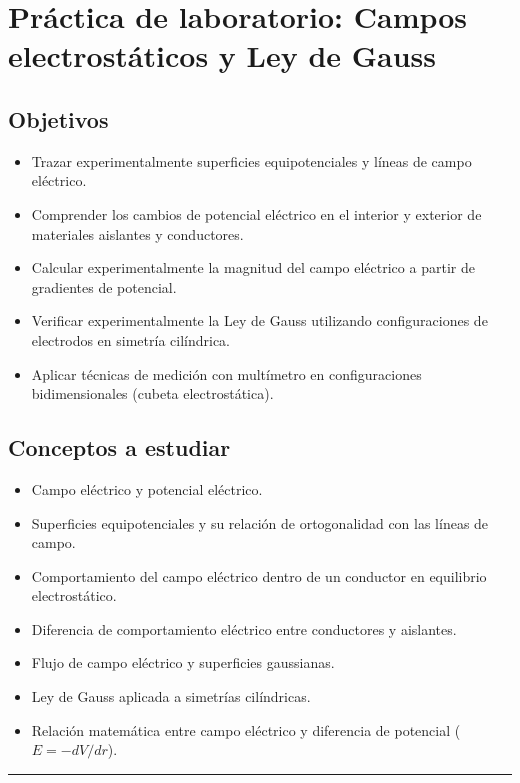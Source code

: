 \section*{Práctica de laboratorio: Campos electrostáticos y Ley de Gauss}

\subsection*{Objetivos}

\begin{itemize}
\item Trazar experimentalmente superficies equipotenciales y líneas de campo eléctrico.
\item Comprender los cambios de potencial eléctrico en el interior y exterior de materiales aislantes y conductores.
\item Calcular experimentalmente la magnitud del campo eléctrico a partir de gradientes de potencial.
\item Verificar experimentalmente la Ley de Gauss utilizando configuraciones de electrodos en simetría cilíndrica.
\item Aplicar técnicas de medición con multímetro en configuraciones bidimensionales (cubeta electrostática).
\end{itemize}

\subsection*{Conceptos a estudiar}

\begin{itemize}
\item Campo eléctrico y potencial eléctrico.
\item Superficies equipotenciales y su relación de ortogonalidad con las líneas de campo.
\item Comportamiento del campo eléctrico dentro de un conductor en equilibrio electrostático.
\item Diferencia de comportamiento eléctrico entre conductores y aislantes.
\item Flujo de campo eléctrico y superficies gaussianas.
\item Ley de Gauss aplicada a simetrías cilíndricas.
\item Relación matemática entre campo eléctrico y diferencia de potencial ($E = -dV/dr$).
\end{itemize}

\rule{\textwidth}{1pt}


